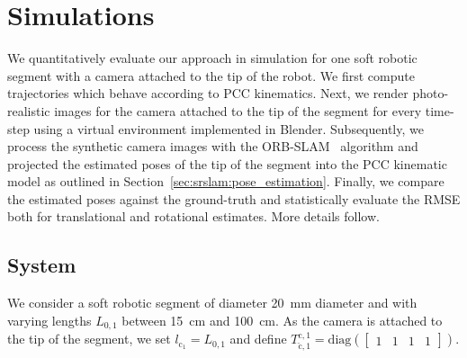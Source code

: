 \section{Simulations}
\label{sec:srslam:simulations}

We quantitatively evaluate our approach in simulation for one soft robotic segment with a camera attached to the tip of the robot. 
We first compute trajectories which behave according to \gls{PCC} kinematics. 
Next, we render photo-realistic images for the camera attached to the tip of the segment for every time-step using a virtual environment implemented in Blender. Subsequently, we process the synthetic camera images with the ORB-SLAM~\cite{mur2017orb} algorithm and projected the estimated poses of the tip of the segment into the \gls{PCC} kinematic model as outlined in Section~\ref{sec:srslam:pose_estimation}. Finally, we compare the estimated poses against the ground-truth and statistically evaluate the \gls{RMSE} both for translational and rotational estimates. More details follow.

\subsection{System}\label{sub:srslam:simulations_system}
We consider a soft robotic segment of diameter \SI{20}{mm} diameter and with varying lengths $L_{0,1}$ between \SI{15}{cm} and \SI{100}{cm}.
As the camera is attached to the tip of the segment, we set $l_{\mathrm{c}_1} = L_{0,1}$ and define $T_{\check{\mathrm{c}},1}^{\mathrm{c},1} = \mathrm{diag}(\begin{bmatrix}1 & 1 & 1 & 1\end{bmatrix})$.

